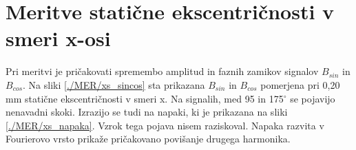 \section{Meritve statične ekscentričnosti v smeri x-osi}
Pri meritvi je pričakovati spremembo amplitud in faznih zamikov signalov $B_{sin}$ in $B_{cos}$. Na sliki \ref{./MER/xs_sincos} sta prikazana $B_{sin}$ in $B_{cos}$ pomerjena pri 0,20 mm statične ekscentričnosti v smeri x. Na signalih, med 95 in 175$^\circ$ se pojavijo nenavadni skoki.
Izrazijo se tudi na napaki, ki je prikazana na sliki \ref{./MER/xs_napaka}. Vzrok tega pojava nisem raziskoval. Napaka razvita v Fourierovo vrsto prikaže pričakovano povišanje drugega harmonika.
\newpage
